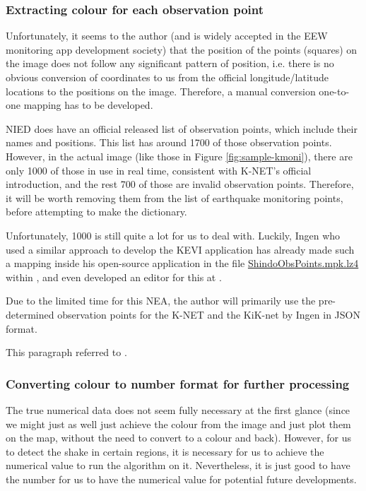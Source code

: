 \subsubsection{Extracting colour for each observation point}

Unfortunately, it seems to the author (and is widely accepted in the EEW monitoring app development society) that the position of the points (squares) on the image does not follow any significant pattern of position, i.e. there is no obvious conversion of coordinates to us from the official longitude/latitude locations to the positions on the image. Therefore, a manual conversion one-to-one mapping has to be developed.

NIED does have an official released list of observation points, which include their names and positions. This list has around 1700 of those observation points. However, in the actual image (like those in Figure \ref{fig:sample-kmoni}), there are only 1000 of those in use in real time, consistent with K-NET's official introduction, and the rest 700 of those are invalid observation points. Therefore, it will be worth removing them from the list of earthquake monitoring points, before attempting to make the dictionary.

Unfortunately, 1000 is still quite a lot for us to deal with. Luckily, Ingen who used a similar approach to develop the KEVI application has already made such a mapping inside his open-source application in the file \href{https://github.com/ingen084/KyoshinEewViewerIngen/blob/develop/src/KyoshinEewViewer/Assets/ShindoObsPoints.mpk.lz4}{ShindoObsPoints.mpk.lz4} within , and even developed an editor for this at .

Due to the limited time for this NEA, the author will primarily use the pre-determined observation points for the K-NET and the KiK-net by Ingen in JSON format.

This paragraph referred to \autocite{blog-ingen-kmoni-data}.

\subsubsection{Converting colour to number format for further processing}

The true numerical data does not seem fully necessary at the first glance (since we might just as well just achieve the colour from the image and just plot them on the map, without the need to convert to a colour and back). However, for us to detect the shake in certain regions, it is necessary for us to achieve the numerical value to run the algorithm on it. Nevertheless, it is just good to have the number for us to have the numerical value for potential future developments.

